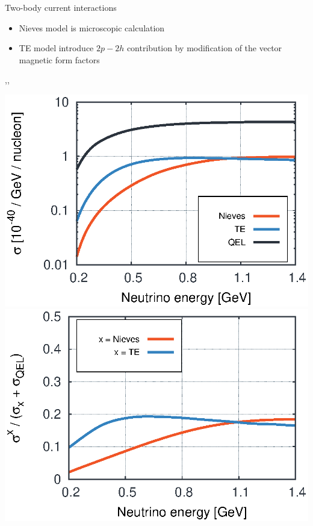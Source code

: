 \begin{wideslide}[toc=]{Two-body current interactions}
\null\vfill

  \begin{itemize}
    \item Nieves model is microscopic calculation
    \item TE model introduce $2p-2h$ contribution by modification of the vector magnetic form factors
  \end{itemize}
  
  \sep\sep

  \twocolumn
  {
    \includegraphics[width=\columnwidth]{figures/mec_xsec.eps}
  }
  {
    \includegraphics[width=\columnwidth]{figures/mec_ratio.eps}  
  }


\vfill\null
\end{wideslide}

